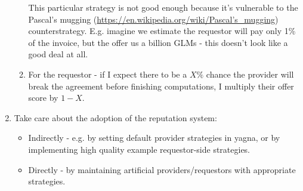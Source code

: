 \documentclass{article}
\begin{document}
\begin{enumerate}
\begin{enumerate}
{                This particular strategy is not good enough because it's vulnerable to the Pascal's mugging
                (\href{https://en.wikipedia.org/wiki/Pascal\%27s\_mugging}{https://en.wikipedia.org/wiki/Pascal's\_mugging}) counterstrategy. 
                E.g. imagine we estimate the requestor will pay only 1\% of the invoice, but the offer us a billion GLMs - this doesn't look like a good deal at all.}
            \item For the requestor - if I expect there to be a $X\%$ chance the provider will break the agreement before finishing computations,
                I multiply their offer score by $1 - X$.
        \end{enumerate}
    \item Take care about the adoption of the reputation system:
        \begin{itemize}
            \item Indirectly - e.g. by setting default provider strategies in yagna, or by implementing high quality example requestor-side strategies.
            \item Directly - by maintaining artificial providers/requestors with appropriate strategies.
        \end{itemize}
\end{enumerate}
\end{document}
